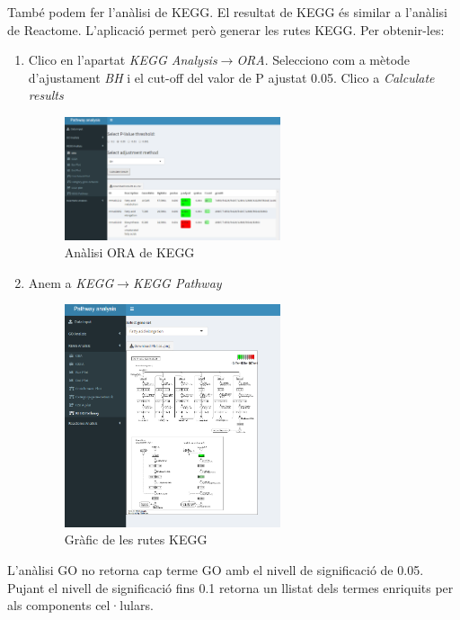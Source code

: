 \documentclass[]{article}
\begin{document}
També podem fer l'anàlisi de KEGG. El resultat de KEGG és similar a l'anàlisi de Reactome. L'aplicació permet però generar les rutes KEGG. Per obtenir-les:

\begin{enumerate}
\item Clico en l'apartat \textit{KEGG Analysis}$\rightarrow$\textit{ORA}. Selecciono com a mètode d'ajustament \textit{BH} i el cut-off del valor de P ajustat 0.05. Clico a \textit{Calculate results}
\begin{figure}[H]
\centering
\includegraphics[width=0.6\textwidth]{Estudi1_Fig11_ORA_KEGG.png} 
\caption{Anàlisi ORA de KEGG}
\end{figure}

\item Anem a \textit{KEGG}$\rightarrow$\textit{KEGG Pathway}
\begin{figure}[H]
\centering
\includegraphics[width=0.6\textwidth]{Estudi1_Fig12_KEGG_Pathway.png} 
\caption{Gràfic de les rutes KEGG}
\end{figure}
\end{enumerate}

L'anàlisi GO no retorna cap terme GO amb el nivell de significació de 0.05. Pujant el nivell de significació fins 0.1 retorna un llistat dels termes enriquits per als components cel·lulars.
\end{document}
